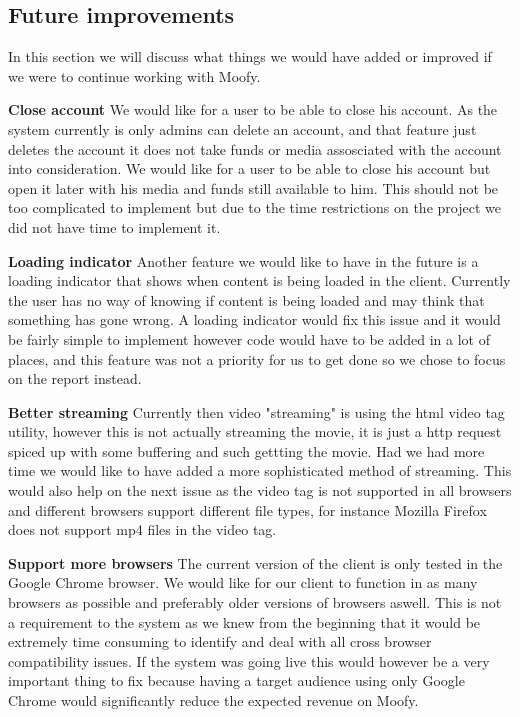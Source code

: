 \subsection{Future improvements}
In this section we will discuss what things we would have added or improved if we were to continue working with Moofy.

\textbf{Close account } We would like for a user to be able to close his account. As the system currently is only admins can delete an account,
and that feature just deletes the account it does not take funds or media assosciated with the account into consideration. We would like for a
user to be able to close his account but open it later with his media and funds still available to him. This should not be too complicated to 
implement but due to the time restrictions on the project we did not have time to implement it.

\textbf{Loading indicator } Another feature we would like to have in the future is a loading indicator that shows when content is being loaded in the client. 
Currently the user has no way of knowing if content is being loaded and may think that something has  gone wrong. A loading indicator would fix this issue 
and it would be fairly simple to implement however code would have to be added in a lot of places, and this feature was not a priority for us to get done so
we chose to focus on the report instead.

\textbf{Better streaming} Currently then video "streaming" is using the html video tag utility, however this is not actually streaming the movie, it is just
a http request spiced up with some buffering and such gettting the movie. Had we had more time we would like to have added a more sophisticated method
of streaming. This would also help on the next issue as the video tag is not supported in all browsers and different browsers support different file types, for
instance Mozilla Firefox does not support mp4 files in the video tag.

\textbf{Support more browsers} The current version of the client is only tested in the Google Chrome browser. We would like for our client to function in as 
many browsers as possible and preferably older versions of browsers aswell. This is not a requirement to the system as we knew from the beginning that it 
would be extremely time consuming to identify and deal with all cross browser compatibility issues. If the system was going live this would however be a very
important thing to fix because having a target audience using only Google Chrome would significantly reduce the expected revenue on Moofy.